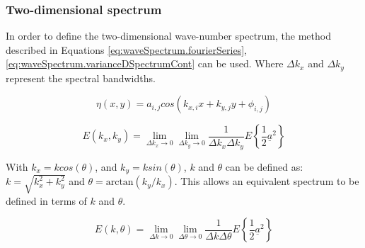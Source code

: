 


\subsubsection{Two-dimensional spectrum} \label{subsec:theory.waves.waveNumberSpectra.2D}
In order to define the two-dimensional wave-number spectrum, the method described in Equations \ref{eq:waveSpectrum.fourierSeries}, \ref{eq:waveSpectrum.varianceDSpectrumCont} can be used. Where $\Delta k_{x}$ and $\Delta k_{y}$ represent the spectral bandwidths.

\begin{equation} \label{eq:waveNumberSpectrum.fourierSeries_2D}
    \eta(x,y) = a_{i,j}cos(k_{x,i}x + k_{y,j}y + \phi_{i,j})
\end{equation}

\begin{equation} \label{eq:waveNumberSpectrum.SpectrumCont_2D}
    E(k_{x},k_{y}) = \lim_{\Delta k_{x} \to 0} \lim_{\Delta k_{y} \to 0} \frac{1}{\Delta k_{x} \Delta k_{y}} E\left \{ \frac{1}{2} \underline{a}^{2}\right \}
\end{equation}

With $k_{x} = kcos(\theta)$, and $k_{y} = ksin(\theta)$, $k$ and $\theta$ can be defined as: $k = \sqrt{k_{x}^2 + k_{y}^2}$ and $\theta = \text{arctan}(k_{y}/k_{x})$. This allows an equivalent spectrum to be defined in terms of $k$ and $\theta$.

\begin{equation} \label{eq:waveNumberSpectrum.SpectrumCont_2D_kTh}
    E(k,\theta) = \lim_{\Delta k \to 0} \lim_{\Delta \theta \to 0} \frac{1}{\Delta k \Delta \theta} E\left \{ \frac{1}{2} \underline{a}^{2}\right \}
\end{equation}

